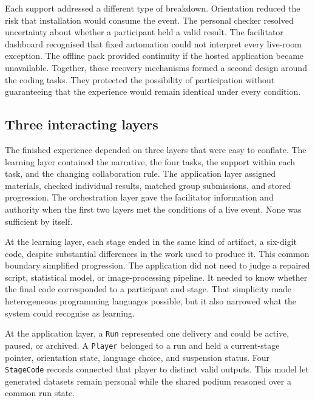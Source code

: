\documentclass[11pt,a4paper]{article}
\begin{document}
Each support addressed a different type of breakdown. Orientation reduced the risk that installation would consume the event. The personal checker resolved uncertainty about whether a participant held a valid result. The facilitator dashboard recognised that fixed automation could not interpret every live-room exception. The offline pack provided continuity if the hosted application became unavailable. Together, these recovery mechanisms formed a second design around the coding tasks. They protected the possibility of participation without guaranteeing that the experience would remain identical under every condition.

\subsection{Three interacting layers}

The finished experience depended on three layers that were easy to conflate. The learning layer contained the narrative, the four tasks, the support within each task, and the changing collaboration rule. The application layer assigned materials, checked individual results, matched group submissions, and stored progression. The orchestration layer gave the facilitator information and authority when the first two layers met the conditions of a live event. None was sufficient by itself.

At the learning layer, each stage ended in the same kind of artifact, a six-digit code, despite substantial differences in the work used to produce it. This common boundary simplified progression. The application did not need to judge a repaired script, statistical model, or image-processing pipeline. It needed to know whether the final code corresponded to a participant and stage. That simplicity made heterogeneous programming languages possible, but it also narrowed what the system could recognise as learning.

At the application layer, a \texttt{Run} represented one delivery and could be active, paused, or archived. A \texttt{Player} belonged to a run and held a current-stage pointer, orientation state, language choice, and suspension status. Four \texttt{StageCode} records connected that player to distinct valid outputs. This model let generated datasets remain personal while the shared podium reasoned over a common run state.
\end{document}
